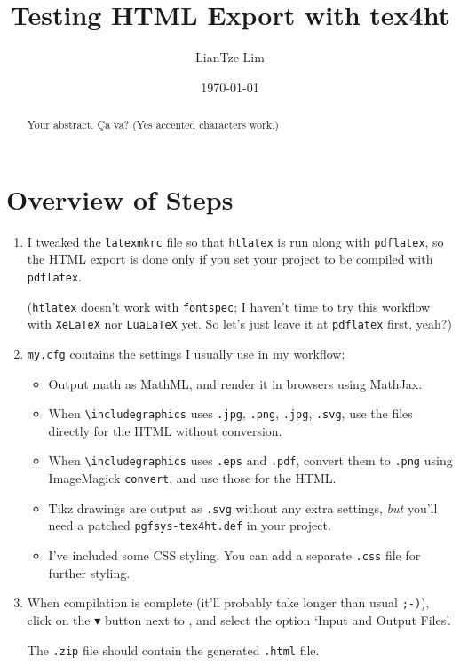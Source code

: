 \documentclass[a4paper]{book}
\title{Testing HTML Export with tex4ht}
\author{LianTze Lim}
\date{\today}
\begin{document}
\maketitle

\begin{abstract}
Your abstract. Ça va? (Yes accented characters work.)
\end{abstract}

\section{Overview of Steps}

\begin{enumerate}
\item I tweaked the \verb|latexmkrc| file so that \verb|htlatex| is run along with \verb|pdflatex|, so the HTML export is done only if you set your project to be compiled with \verb|pdflatex|.

(\verb|htlatex| doesn't work with \verb|fontspec|; I haven't time to try this workflow with \verb|XeLaTeX| nor \verb|LuaLaTeX| yet. So let's just leave it at \verb|pdflatex| first, yeah?)

\item \verb|my.cfg| contains the settings I usually use in my workflow:
  \begin{itemize}
  \item Output math as MathML, and render it in browsers using MathJax.
  \item When \verb|\includegraphics| uses \verb|.jpg|, \verb|.png|, \verb|.jpg|, \verb|.svg|, use the files directly for the HTML without conversion.
  \item When \verb|\includegraphics| uses \verb|.eps| and \verb|.pdf|, convert them to \verb|.png| using ImageMagick \verb|convert|, and use those for the HTML.

  \item Tikz drawings are output as \verb|.svg| without any extra settings, \emph{but} you'll need a patched \verb|pgfsys-tex4ht.def| in your project.
  
  \item I've included some CSS styling. You can add a separate \verb|.css| file for further styling.
  \end{itemize}
  
\item When compilation is complete (it'll probably take longer than usual \texttt{;-)}), click on the \colorbox{green!80!black}{\color{white}$\blacktriangledown$} button next to , and select the option `Input and Output Files'.

The \verb|.zip| file should contain the generated \verb|.html| file.
\end{enumerate}
\end{document}
